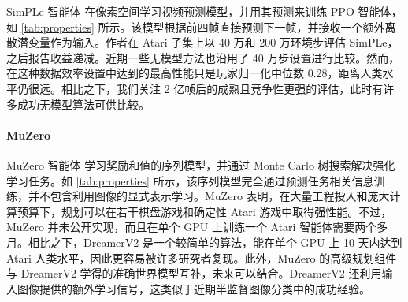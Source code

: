 SimPLe 智能体\citep{kaiser2019simple} 在像素空间学习视频预测模型，并用其预测来训练 PPO 智能体\citep{schulman2017ppo}，如 \cref{tab:properties} 所示。该模型根据前四帧直接预测下一帧，并接收一个额外离散潜变量作为输入。作者在 Atari 子集上以 40 万和 200 万环境步评估 SimPLe，之后报告收益递减。近期一些无模型方法也沿用了 40 万步设置进行比较\citep{srinivas2020curl,kostrikov2020drq}。然而，在这种数据效率设置中达到的最高性能只是玩家归一化中位数 0.28\citep{kostrikov2020drq}，距离人类水平仍很远。相比之下，我们关注 2 亿帧后的成熟且竞争性更强的评估，此时有许多成功无模型算法可供比较。

\paragraph{MuZero}

MuZero 智能体\citep{schrittwieser2019muzero} 学习奖励和值的序列模型\citep{oh2017vpn}，并通过 Monte Carlo 树搜索解决强化学习任务\citep[MCTS;][]{coulom2006efficient,silver2017alphago}。如 \cref{tab:properties} 所示，该序列模型完全通过预测任务相关信息训练，并不包含利用图像的显式表示学习。MuZero 表明，在大量工程投入和庞大计算预算下，规划可以在若干棋盘游戏和确定性 Atari 游戏中取得强性能。不过，MuZero 并未公开实现，而且在单个 GPU 上训练一个 Atari 智能体需要两个多月。相比之下，DreamerV2 是一个较简单的算法，能在单个 GPU 上 10 天内达到 Atari 人类水平，因此更容易被许多研究者复现。此外，MuZero 的高级规划组件与 DreamerV2 学得的准确世界模型互补，未来可以结合。DreamerV2 还利用输入图像提供的额外学习信号，这类似于近期半监督图像分类中的成功经验\citep{chen2020simclr,he2020moco,grill2020byol}。
